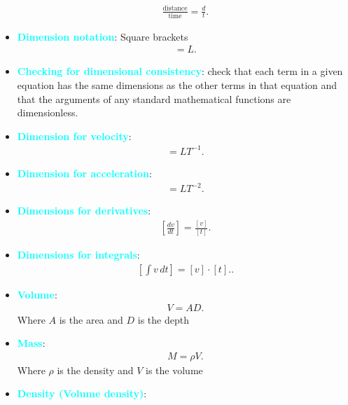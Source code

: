 \documentclass{report}
\begin{document}
\begin{itemize}
            \begin{align*}
                \frac{\text{distance}}{\text{time}} = \frac{d}{t}
            .\end{align*}
        \item \textbf{\textcolor{cyan}{Dimension notation}}: Square brackets
            \begin{align*}
                [r] = L
            .\end{align*}
        \item \textbf{\textcolor{cyan}{Checking for dimensional consistency}}: 
            check that each term in a given equation has the same dimensions as the other terms in that equation and that the arguments of any standard mathematical functions are dimensionless.
        \item \textbf{\textcolor{cyan}{Dimension for velocity}}:
            \begin{align*}
                [v] = LT^{-1}
            .\end{align*}
        \item \textbf{\textcolor{cyan}{Dimension for acceleration}}:
            \begin{align*}
                [a] = LT^{-2}
            .\end{align*}
        \item \textbf{\textcolor{cyan}{Dimensions for derivatives}}:
            \begin{align*}
                \left[\frac{dv}{dt}\right] = \frac{[v]}{[t]}
            .\end{align*}
        \item \textbf{\textcolor{cyan}{Dimensions for integrals}}:
            \begin{align*}
                \left[ \int v \, dt \right] = [v] \cdot [t].
            .\end{align*}
        \item \textbf{\textcolor{cyan}{Volume}}:
            \begin{align*}
                V = AD
            .\end{align*}
            Where $A$ is the area and $D$ is the depth
        \item \textbf{\textcolor{cyan}{Mass}}:
            \begin{align*}
                M = \rho V
            .\end{align*}
            Where $\rho$ is the density and $V$ is the volume
        \item \textbf{\textcolor{cyan}{Density (Volume density)}}:

\end{itemize}
\end{document}
